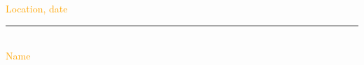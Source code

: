 \documentclass[12pt]{article}
\begin{document}
\vspace{1cm}
\textcolor{orange}{Location, date} \\

\vspace{3cm}

\noindent\rule{0.5\textwidth}{0.4pt} \\

\textcolor{orange}{Name}

\end{document}
